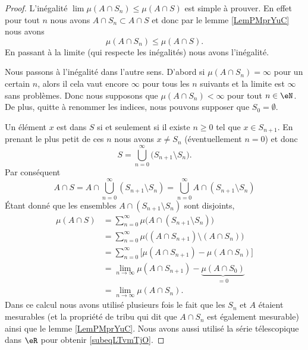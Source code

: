 \begin{proof}
    L'inégalité \( \lim\mu(A\cap S_n)\leq \mu(A\cap S)\) est simple à prouver. En effet pour tout \( n\) nous avons \( A\cap S_n\subset A\cap S\) et donc par le lemme \ref{LemPMprYuC} nous avons
    \begin{equation}
        \mu(A\cap S_n)\leq\mu(A\cap S).
    \end{equation}
    En passant à la limite (qui respecte les inégalités) nous avons l'inégalité.

    Nous passons à l'inégalité dans l'autre sens. D'abord si \( \mu(A\cap S_n)=\infty\) pour un certain \( n\), alors il cela vaut encore \( \infty\) pour tous les \( n\) suivants et la limite est \( \infty\) sans problèmes. Donc nous supposons que \( \mu(A\cap S_n)<\infty\) pour tout \( n\in \eN\). De plus, quitte à renommer les indices, nous pouvons supposer que \( S_0=\emptyset\).

    Un élément \( x\) est dans \( S\) si et seulement si il existe \( n\geq 0\) tel que \( x\in S_{n+1}\). En prenant le plus petit de ces \( n\) nous avons \( x\neq S_n\) (éventuellement \( n=0\)) et donc
    \begin{equation}
        S=\bigcup_{n=0}^{\infty}\big( S_{n+1}\setminus S_n \big).
    \end{equation}
    Par conséquent
    \begin{equation}
            A\cap S=A\cap\bigcup_{n=0}^{\infty}(S_{n+1}\setminus S_n)
            =\bigcup_{n=0}^{\infty}A\cap(S_{n+1}\setminus S_n)
    \end{equation}
    Étant donné que les ensembles \( A\cap(S_{n+1}\setminus S_n)\) sont disjoints,
    \begin{subequations}
        \begin{align}
            \mu(A\cap S)&=\sum_{n=0}^{\infty}\mu\big( A\cap(S_{n+1}\setminus S_n) \big)\\
            &=\sum_{n=0}^{\infty}\mu\Big( (A\cap S_{n+1})\setminus (A\cap S_n) \Big)\\
            &=\sum_{n=0}^{\infty}\big[ \mu(A\cap S_{n+1})-\mu(A\cap S_n) \big]\\
            &=\lim_{n\to \infty} \mu(A\cap S_{n+1})-\underbrace{\mu(A\cap S_0)}_{=0}\label{subeqLTvmTjO}\\
            &=\lim_{n\to \infty} \mu(A\cap S_n).
        \end{align}
    \end{subequations}
    Dans ce calcul nous avons utilisé plusieurs fois le fait que les \( S_n\) et \( A\) étaient mesurables (et la propriété de tribu qui dit que \( A\cap S_n\) est également mesurable) ainsi que le lemme \ref{LemPMprYuC}. Nous avons aussi utilisé la série télescopique dans \( \eR\) pour obtenir \eqref{subeqLTvmTjO}.
\end{proof}

